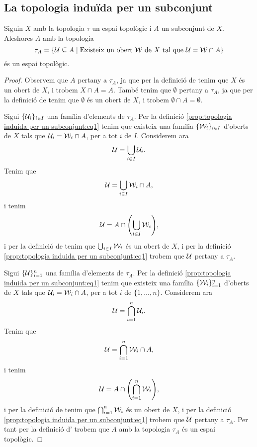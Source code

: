 \documentclass[../../Main.tex]{subfiles}
\begin{document}
	\subsection{La topologia induïda per un subconjunt}
	\begin{proposition}
		\label{prop:topologia induida per un subconjunt}
		Siguin \(X\) amb la topologia \(\tau\) un espai topològic i \(A\) un subconjunt de \(X\). Aleshores \(A\) amb la topologia
		\begin{equation}
			\label{prop:topologia induida per un subconjunt:eq1}
			\tau_{A}=\{\mathcal{U}\subseteq A\mid\text{Existeix un obert }\mathcal{W}\text{ de }X\text{ tal que }\mathcal{U}=\mathcal{W}\cap A\}
		\end{equation}
		és un espai topològic.
		\begin{proof}
			Observem que \(A\) pertany a \(\tau_{A}\), ja que per la definició de  tenim que \(X\) és un obert de \(X\), i trobem \(X\cap A=A\). També tenim que \(\emptyset\) pertany a \(\tau_{A}\), ja que per la definició de  tenim que \(\emptyset\) és un obert de \(X\), i trobem \(\emptyset\cap A=\emptyset\).
			
			Sigui \(\{\mathcal{U}_{i}\}_{i\in I}\) una família d'elements de \(\tau_{A}\). Per la definició \eqref{prop:topologia induida per un subconjunt:eq1} tenim que existeix una família \(\{\mathcal{W}_{i}\}_{i\in I}\) d'oberts de \(X\) tals que \(\mathcal{U}_{i}=\mathcal{W}_{i}\cap A\), per a tot \(i\) de \(I\). Considerem ara
			\[
			    \mathcal{U}=\bigcup_{i\in I}\mathcal{U}_{i}.
			\]
			Tenim que
			\[
			    \mathcal{U}=\bigcup_{i\in I}\mathcal{W}_{i}\cap A,
			\]
			i tenim
			\[
			    \obert{U}=A\cap\left(\bigcup_{i\in I}\obert{W}_{i}\right),
			\]
			i per la definició de  tenim que \(\bigcup_{i\in I}\mathcal{W}_{i}\) és un obert de \(X\), i per la definició \eqref{prop:topologia induida per un subconjunt:eq1} trobem que \(\mathcal{U}\) pertany a \(\tau_{A}\).
			
			Sigui \(\{\mathcal{U}\}_{i=1}^{n}\) una família d'elements de \(\tau_{A}\). Per la definició \eqref{prop:topologia induida per un subconjunt:eq1} tenim que existeix una família \(\{\mathcal{W}_{i}\}_{i=1}^{n}\) d'oberts de \(X\) tals que \(\mathcal{U}_{i}=\mathcal{W}_{i}\cap A\), per a tot \(i\) de \(\{1,\dots,n\}\). Considerem ara
			\[
			    \mathcal{U}=\bigcap_{i=1}^{n}\mathcal{U}_{i}.
			\]
			Tenim que
			\[
			    \mathcal{U}=\bigcap_{i=1}^{n}\mathcal{W}_{i}\cap A,
			\]
			i tenim
			\[
			    \obert{U}=A\cap\left(\bigcap_{i=1}^{n}\obert{W}_{i}\right),
			\]
			i per la definició de  tenim que \(\bigcap_{i=1}^{n}\mathcal{W}_{i}\) és un obert de \(X\), i per la definició \eqref{prop:topologia induida per un subconjunt:eq1} trobem que \(\mathcal{U}\) pertany a \(\tau_{A}\). Per tant per la definició d' trobem que \(A\) amb la topologia \(\tau_{A}\) és un espai topològic.
		\end{proof}
	\end{proposition}
\end{document}
